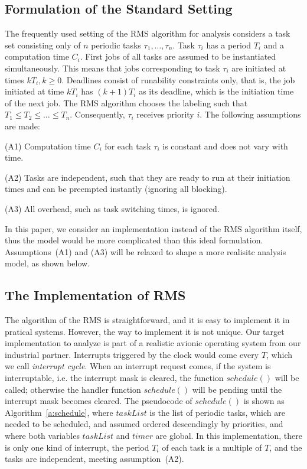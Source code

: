 \documentclass{llncs}
\begin{document}
\subsection{Formulation of the Standard Setting}
The frequently used setting of the RMS algorithm for analysis
considers a task set consisting only of $n$ periodic tasks
$\tau_1,\ldots,\tau_n$. Task $\tau_i$ has a period $T_i$ and a
computation time $C_i$. First jobs of all tasks are assumed to be
instantiated simultaneously. This means that jobs corresponding to
task $\tau_i$ are initiated at times $kT_i, k\ge 0$. Deadlines consist
of runability constraints only, that is, the job initiated at time
$kT_i$ has $(k+1)T_i$ as its deadline, which is the initiation time of
the next job. The RMS algorithm chooses the labeling such that $T_1\le
T_2\le \ldots \le T_n$. Consequently, $\tau_i$ receives priority
$i$. The following assumptions are made:

(A1) Computation time $C_i$ for each task $\tau_i$ is constant and
does not vary with time.

(A2) Tasks are independent, such that they are ready to run at their
initiation times and can be preempted instantly (ignoring all
blocking).

(A3) All overhead, such as task switching times, is ignored.

In this paper, we consider an implementation instead of the RMS
algorithm itself, thus the model would be more complicated than this
ideal formulation.  Assumptions~(A1) and (A3) will be relaxed to shape a more
realisitc analysis model, as shown below.

\subsection{The Implementation of RMS}
The algorithm of the RMS is straightforward, and it is easy to
implement it in pratical systems. However, the way to implement it is
not unique. Our target implementation to analyze is part of a
realistic avionic operating system from our industrial
partner. Interrupts triggered by the clock would come every $T$, which
we call \emph{interrupt cycle}. When an interrupt request comes, if
the system is interruptable, i.e. the interrupt mask is cleared, the
function $schedule()$ will be called; otherwise the handler function
$schedule()$ will be pending until the interrupt mask becomes cleared.
The pseudocode of $schedule()$ is shown as Algorithm~\ref{a:schedule},
where $taskList$ is the list of periodic tasks, which are needed to be
scheduled, and assumed ordered descendingly by priorities, and where
both variables $taskList$ and $timer$ are global. In this
implementation, there is only one kind of interrupt, the period $T_i$
of each task is a multiple of $T$, and the tasks are independent,
meeting assumption~(A2).
\end{document}
